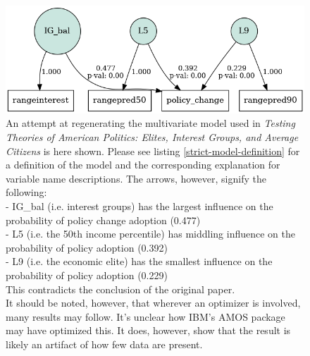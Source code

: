 \documentclass[]{article}
\begin{document}
\begin{figure}[H]
	\begin{center}
		\includegraphics[width=\linewidth]{./figures/generated/multivariate-analysis/strict-regen-multivariate-correlation.png}
	\end{center}
	\caption{An attempt at regenerating the multivariate model used in \textit{Testing Theories of American Politics: Elites, Interest Groups, and Average Citizens} is here shown. Please see listing \ref{strict-model-definition} for a definition of the model and the corresponding explanation for variable name descriptions. The arrows, however, signify the following:\\ - IG\_bal (i.e. interest groups) has the largest influence on the probability of policy change adoption (0.477)\\- L5 (i.e. the 50th income percentile) has middling influence on the probability of policy adoption (0.392)\\- L9 (i.e. the economic elite) has the smallest influence on the probability of policy adoption (0.229)\\This contradicts the conclusion of the original paper.\\It should be noted, however, that wherever an optimizer is involved, many results may follow. It's unclear how IBM's AMOS package may have optimized this. It does, however, show that the result is likely an artifact of how few data are present.}
	\label{strict-regen-multivariate-correlation}
\end{figure}
\end{document}
